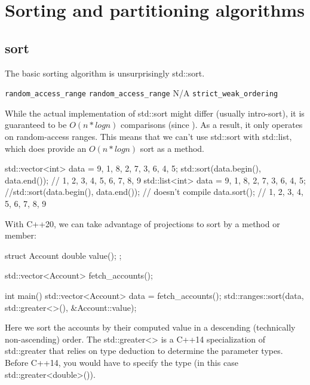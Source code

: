\section{Sorting and partitioning algorithms}

\subsection{sort}

The basic sorting algorithm is unsurprisingly std::sort.


\constraints
    {\texttt{random\_access\_range}}
    {\texttt{random\_access\_range}}
    {N/A}
    {\texttt{strict\_weak\_ordering}}
    
While the actual implementation of std::sort might differ (usually intro-sort), it is guaranteed to be $O(n*logn)$ comparisons (since ). As a result, it only operates on random-access ranges. This means that we can’t use std::sort with std::list, which does provide an $O(n*logn)$ sort as a method.

\begin{box-note}
\begin{cppcode}
{
    std::vector<int> data = {9, 1, 8, 2, 7, 3, 6, 4, 5};
    std::sort(data.begin(), data.end());
    // 1, 2, 3, 4, 5, 6, 7, 8, 9
}
{
    std::list<int> data = {9, 1, 8, 2, 7, 3, 6, 4, 5};
    //std::sort(data.begin(), data.end()); // doesn't compile
    data.sort();
    // 1, 2, 3, 4, 5, 6, 7, 8, 9
}
\end{cppcode}
\end{box-note}

With C++20, we can take advantage of projections to sort by a method or member:

\begin{box-note}
\begin{cppcode}
struct Account {
    double value();
};

std::vector<Account> fetch_accounts();

int main() {
    std::vector<Account> data = fetch_accounts();
    std::ranges::sort(data, std::greater<>(), &Account::value);
}
\end{cppcode}
\end{box-note}

Here we sort the accounts by their computed value in a descending (technically non-ascending) order. The std::greater<> is a C++14 specialization of std::greater that relies on type deduction to determine the parameter types. Before C++14, you would have to specify the type (in this case std::greater<double>()).

